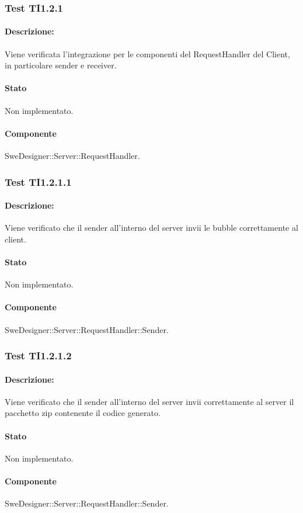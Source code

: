 \documentclass[../PianoDiQualifica.tex]{subfiles}
\begin{document}
	\subsubsection{Test TI1.2.1}
	\paragraph{Descrizione:} Viene verificata l'integrazione per le componenti del RequestHandler del Client, in particolare sender e receiver.
	\paragraph{Stato} Non implementato.
	\paragraph{Componente} SweDesigner::Server::RequestHandler.
	\subsubsection{Test TI1.2.1.1}
	\paragraph{Descrizione:} Viene verificato che il sender all'interno del server invii le bubble correttamente al client.
	\paragraph{Stato} Non implementato.
	\paragraph{Componente} SweDesigner::Server::RequestHandler::Sender.
	
	\subsubsection{Test TI1.2.1.2}
	\paragraph{Descrizione:} Viene verificato che il sender all'interno del server invii  correttamente al server il pacchetto zip contenente il codice generato.
	\paragraph{Stato} Non implementato.
	\paragraph{Componente} SweDesigner::Server::RequestHandler::Sender.
\end{document}
